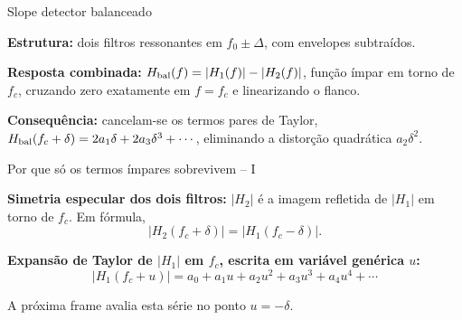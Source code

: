 
\begin{frame}{Slope detector balanceado}

\small
\textbf{Estrutura:} dois filtros ressonantes em $f_0 \pm \Delta$, com envelopes subtraídos.

\begin{center}
\end{center}

\pause
\textbf{Resposta combinada:} $H_{\rm bal}(f) = |H_1(f)| - |H_2(f)|$, função ímpar em torno de $f_c$, cruzando zero exatamente em $f = f_c$ e linearizando o flanco.

\pause
\textbf{Consequência:} cancelam-se os termos pares de Taylor, $H_{\rm bal}(f_c + \delta) = 2 a_1 \delta + 2 a_3 \delta^3 + \cdots$, eliminando a distorção quadrática $a_2\delta^2$.

\end{frame}


\begin{frame}{Por que só os termos ímpares sobrevivem -- I}

\textbf{Simetria especular dos dois filtros:} $|H_2|$ é a imagem refletida de $|H_1|$ em torno de $f_c$. Em fórmula,
\[
|H_2(f_c + \delta)| = |H_1(f_c - \delta)|.
\]

\pause
\vspace{0.3cm}
\textbf{Expansão de Taylor de $|H_1|$ em $f_c$, escrita em variável genérica $u$:}
\[
|H_1(f_c + u)| = a_0 + a_1 u + a_2 u^2 + a_3 u^3 + a_4 u^4 + \cdots
\]

\pause
\vspace{0.3cm}
A próxima frame avalia esta série no ponto $u = -\delta$.

\end{frame}

